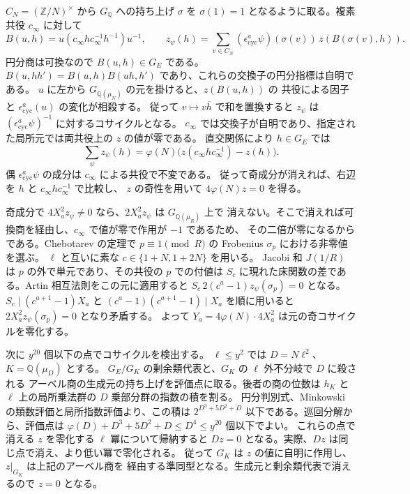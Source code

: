 \(C_N=(\mathbb Z/N)^\times\) から \(G_{\mathbb Q}\) への持ち上げ \(\sigma\) を
\(\sigma(1)=1\) となるように取る。複素共役 \(c_\infty\) に対して
\[
 B(u,h)=u(c_\infty h c_\infty^{-1}h^{-1})u^{-1},\qquad
 z_\psi(h)=\sum_{v\in C_N}(\epsilon_{\mathrm{cyc}}^a\psi)(\sigma(v))\,z(B(\sigma(v),h)).
\]
円分商は可換なので \(B(u,h)\in G_E\) である。
\(B(u,hh')=B(u,h)B(uh,h')\) であり、これらの交換子の円分指標は自明である。
\(u\) に左から \(G_{\mathbb Q(\mu_N)}\) の元を掛けると、\(z(B(u,h))\) の
共役による因子と \(\epsilon_{\mathrm{cyc}}^a(u)\) の変化が相殺する。
従って \(v\mapsto v\overline h\) で和を置換すると
\(z_\psi\) は \((\epsilon_{\mathrm{cyc}}^a\psi)^{-1}\) に対するコサイクルとなる。
\(c_\infty\) では交換子が自明であり、指定された局所元では両共役上の \(z\) の値が零である。
直交関係により \(h\in G_E\) では
\[
 \sum_\psi z_\psi(h)=\varphi(N)\bigl(z(c_\infty h c_\infty^{-1})-z(h)\bigr).
\]
偶 \(\epsilon_{\mathrm{cyc}}^a\psi\) の成分は \(c_\infty\) による共役で不変である。
従って奇成分が消えれば、右辺を \(h\) と \(c_\infty h c_\infty^{-1}\) で比較し、
\(z\) の奇性を用いて \(4\varphi(N)z=0\) を得る。

奇成分で \(4X_a^2z_\psi\ne0\) なら、\(2X_a^2z_\psi\) は \(G_{\mathbb Q(\mu_R)}\) 上で
消えない。そこで消えれば可換商を経由し、\(c_\infty\) で値が零で作用が \(-1\) であるため、
その二倍が零になるからである。Chebotarev の定理で
\(p\equiv1\pmod R\) の Frobenius \(\sigma_p\) における非零値を選ぶ。
\(\ell\) と互いに素な \(c\in\{1+N,1+2N\}\) を用いる。
Jacobi 和 \(J(1/R)\) は \(p\) の外で単元であり、その共役の \(p\) での付値は
\(S_c\) に現れた床関数の差である。Artin 相互法則をこの元に適用すると
\(S_c\,2(c^a-1)z_\psi(\sigma_p)=0\) となる。
\(S_c\mid(c^{a+1}-1)X_a\) と \((c^a-1)(c^{a+1}-1)\mid X_a\) を順に用いると
\(2X_a^2z_\psi(\sigma_p)=0\) となり矛盾する。
よって \(Y_a=4\varphi(N)\cdot4X_a^2\) は元の奇コサイクルを零化する。

次に \(y^{20}\) 個以下の点でコサイクルを検出する。
\(\ell\le y^2\) では \(D=N\ell^2\)、\(K=\mathbb Q(\mu_D)\) とする。
\(G_E/G_K\) の剰余類代表と、\(G_K\) の \(\ell\) 外不分岐で \(D\) に殺される
アーベル商の生成元の持ち上げを評価点に取る。後者の商の位数は
\(h_K\) と \(\ell\) 上の局所乗法群の \(D\) 乗部分群の指数の積を割る。
円分判別式、Minkowski の類数評価と局所指数評価より、この積は
\(2^{D^3+5D^2+D}\) 以下である。巡回分解から、評価点は
\(\varphi(D)+D^3+5D^2+D\le D^4\le y^{20}\) 個以下でよい。
これらの点で消える \(z\) を零化する \(\ell\) 冪について帰納すると \(Dz=0\)
となる。実際、\(Dz\) は同じ点で消え、より低い冪で零化される。
従って \(G_K\) は \(z\) の値に自明に作用し、\(z|_{G_K}\) は上記のアーベル商を
経由する準同型となる。生成元と剰余類代表で消えるので \(z=0\) となる。

